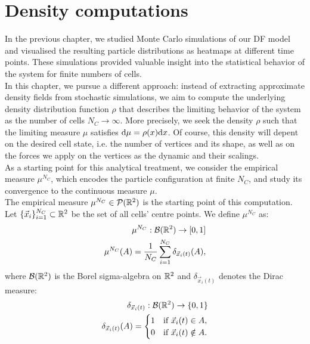 \section{Density computations} \label{density}
In the previous chapter, we studied Monte Carlo simulations of our DF model and visualised the resulting particle distributions as heatmaps at different time points. 
These simulations provided valuable insight into the statistical behavior of the system for finite numbers of cells. \\
In this chapter, we pursue a different approach: instead of extracting approximate density fields from stochastic simulations, we aim to compute the underlying density distribution function \( \rho \) that describes the limiting behavior of the system as the number of cells \( N_C \to \infty \). 
More precisely, we seek the density \( \rho \) such that the limiting measure \( \mu \) satisfies \( \mathrm{d} \mu = \rho(x) \mathrm{d} x \). 
Of course, this density will depent on the desired cell state, i.e. the number of vertices and its shape, as well as on the forces we apply on the vertices as the dynamic and their scalings. \\ 
As a starting point for this analytical treatment, we consider the empirical measure \( \mu^{N_C} \), which encodes the particle configuration at finite \( N_C \), and study its convergence to the continuous measure \( \mu \). \\
The empirical measure $\mu^{N_C} \in \mathcal{P}(\mathbb{R}^{2})$ is the starting point of this computation. \\
Let $\{\vec{x}_i\}_{i=1}^{N_C} \subset \mathbb{R}^2$ be the set of all cells' centre points. 
We define $\mu^{N_C}$ as:  
\begin{align*}
    \mu^{N_C}: \mathcal{B}(\mathbb{R}^2) \rightarrow [0,1]  \\
    \mu^{N_C}(A) = \frac{1}{N_C} \sum\limits_{i=1}^{N_C} \delta_{\vec{x}_i(t)}(A),
\end{align*}
where $\mathcal{B}(\mathbb{R}^2)$ is the Borel sigma-algebra on $\mathbb{R}^2$ and \( \delta_{\vec{x}_i(t)} \) denotes the Dirac measure: 
\begin{align*}
    \delta_{\vec{x}_i(t)}: \mathcal{B}(\mathbb{R}^2) \rightarrow \{0,1\}  \\
    \delta_{\vec{x}_i(t)}(A) = \begin{cases}
        1 & \text{if } \vec{x}_i(t) \in A, \\
        0 & \text{if } \vec{x}_i(t) \notin A.
   \end{cases}
\end{align*}
